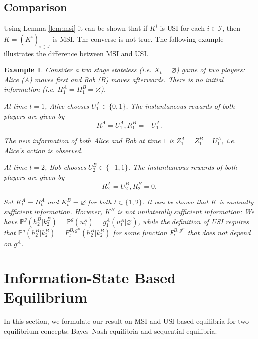 \documentclass[pdflatex,sn-basic]{sn-jnl}
\renewcommand{\Pr}{\mathbb{P}}
\newcommand{\Comp}{K}
\newcommand{\comp}{k}
\theoremstyle{thmstyleone}%
\theoremstyle{thmstyletwo}%
\theoremstyle{thmstylethree}%
\newtheorem{example}{Example}
\begin{document}
\subsection{Comparison}
Using Lemma \ref{lem:msi} it can be shown that if $\Comp^i$ is USI for each $i\in\mathcal{I}$, then $\Comp=(\Comp^i)_{i\in\mathcal{I}}$ is MSI. The {converse} is not true. The following example illustrates the difference between MSI and USI. 
\begin{example}\label{ex:msinotusi}
	Consider a two stage stateless (i.e. $X_t=\varnothing$) game of two players: Alice (A) moves first and Bob (B) moves afterwards. There is no initial information (i.e. $H_1^A=H_1^B=\varnothing$).
	
	At time $t=1$, Alice chooses $U_1^A\in \{0, 1\}$. The instantaneous rewards of both players are given by
	\begin{equation}
		R_1^A = U_1^A, R_1^B = -U_1^A.
	\end{equation}
	
	The new information of both Alice and Bob at time $1$ is $Z_1^A=Z_1^B = U_1^A$, i.e. Alice's action is observed.
	
	At time $t=2$, Bob chooses $U_2^B \in \{-1, 1\}$.
	The instantaneous rewards of both players are given by
	\begin{equation}
		R_2^A = U_2^B, R_2^B = 0.
	\end{equation}
	
	Set $\Comp_t^A=H_t^A$ and $\Comp_t^B=\varnothing$ for both $t\in \{1, 2\}$. It can be shown that $\Comp$ is mutually sufficient information. However, $\Comp^B$ is not unilaterally sufficient information: We have $\Pr^g(h_2^B|\comp_2^B)=\Pr^g(u_1^A) = g_1^A(u_1^A|\varnothing)$, while the definition of USI requires that $\Pr^g(h_2^B|\comp_2^B) = F_t^{B, g^B}(h_2^B|\comp_2^B)$ for some function $F_t^{B, g^B}$ that does not depend on $g^A$.
\end{example}


\section{Information-State Based Equilibrium}\label{sec:isbe}
In this section, we formulate our result on MSI and USI based equilibria for two equilibrium concepts: Bayes--Nash equilibria and sequential equilibria. 
\end{document}
